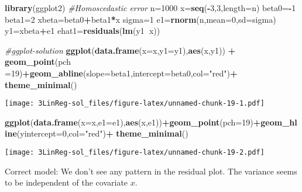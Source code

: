 \documentclass[]{article}
\newenvironment{Shaded}{\begin{snugshade}}{\end{snugshade}}
\newcommand{\KeywordTok}[1]{\textcolor[rgb]{0.13,0.29,0.53}{\textbf{#1}}}
\newcommand{\DataTypeTok}[1]{\textcolor[rgb]{0.13,0.29,0.53}{#1}}
\newcommand{\DecValTok}[1]{\textcolor[rgb]{0.00,0.00,0.81}{#1}}
\newcommand{\StringTok}[1]{\textcolor[rgb]{0.31,0.60,0.02}{#1}}
\newcommand{\CommentTok}[1]{\textcolor[rgb]{0.56,0.35,0.01}{\textit{#1}}}
\newcommand{\OperatorTok}[1]{\textcolor[rgb]{0.81,0.36,0.00}{\textbf{#1}}}
\newcommand{\NormalTok}[1]{#1}
\begin{document}
\begin{Shaded}
\begin{Highlighting}[]
\KeywordTok{library}\NormalTok{(ggplot2)}
\CommentTok{#Homoscedastic error}
\NormalTok{n=}\DecValTok{1000}
\NormalTok{x=}\KeywordTok{seq}\NormalTok{(}\OperatorTok{-}\DecValTok{3}\NormalTok{,}\DecValTok{3}\NormalTok{,}\DataTypeTok{length=}\NormalTok{n)}
\NormalTok{beta0=}\OperatorTok{-}\DecValTok{1}
\NormalTok{beta1=}\DecValTok{2}
\NormalTok{xbeta=beta0}\OperatorTok{+}\NormalTok{beta1}\OperatorTok{*}\NormalTok{x}
\NormalTok{sigma=}\DecValTok{1}
\NormalTok{e1=}\KeywordTok{rnorm}\NormalTok{(n,}\DataTypeTok{mean=}\DecValTok{0}\NormalTok{,}\DataTypeTok{sd=}\NormalTok{sigma)}
\NormalTok{y1=xbeta}\OperatorTok{+}\NormalTok{e1}
\NormalTok{ehat1=}\KeywordTok{residuals}\NormalTok{(}\KeywordTok{lm}\NormalTok{(y1}\OperatorTok{~}\NormalTok{x))}

\CommentTok{#ggplot-solution}
\KeywordTok{ggplot}\NormalTok{(}\KeywordTok{data.frame}\NormalTok{(}\DataTypeTok{x=}\NormalTok{x,}\DataTypeTok{y1=}\NormalTok{y1),}\KeywordTok{aes}\NormalTok{(x,y1)) }\OperatorTok{+}
\StringTok{  }\KeywordTok{geom_point}\NormalTok{(}\DataTypeTok{pch =}\DecValTok{19}\NormalTok{)}\OperatorTok{+}\KeywordTok{geom_abline}\NormalTok{(}\DataTypeTok{slope=}\NormalTok{beta1,}\DataTypeTok{intercept=}\NormalTok{beta0,}\DataTypeTok{col=}\StringTok{"red"}\NormalTok{)}\OperatorTok{+}\StringTok{  }\KeywordTok{theme_minimal}\NormalTok{()}
\end{Highlighting}
\end{Shaded}

\texttt{[image: 3LinReg-sol\_files/figure-latex/unnamed-chunk-19-1.pdf]}

\begin{Shaded}
\begin{Highlighting}[]
\KeywordTok{ggplot}\NormalTok{(}\KeywordTok{data.frame}\NormalTok{(}\DataTypeTok{x=}\NormalTok{x,}\DataTypeTok{e1=}\NormalTok{e1),}\KeywordTok{aes}\NormalTok{(x,e1))}\OperatorTok{+}\KeywordTok{geom_point}\NormalTok{(}\DataTypeTok{pch=}\DecValTok{19}\NormalTok{)}\OperatorTok{+}\KeywordTok{geom_hline}\NormalTok{(}\DataTypeTok{yintercept=}\DecValTok{0}\NormalTok{,}\DataTypeTok{col=}\StringTok{"red"}\NormalTok{)}\OperatorTok{+}\StringTok{  }\KeywordTok{theme_minimal}\NormalTok{()}
\end{Highlighting}
\end{Shaded}

\texttt{[image: 3LinReg-sol\_files/figure-latex/unnamed-chunk-19-2.pdf]}

Correct model: We don't see any pattern in the residual plot. The
variance seems to be independent of the covariate \(x\).
\end{document}
